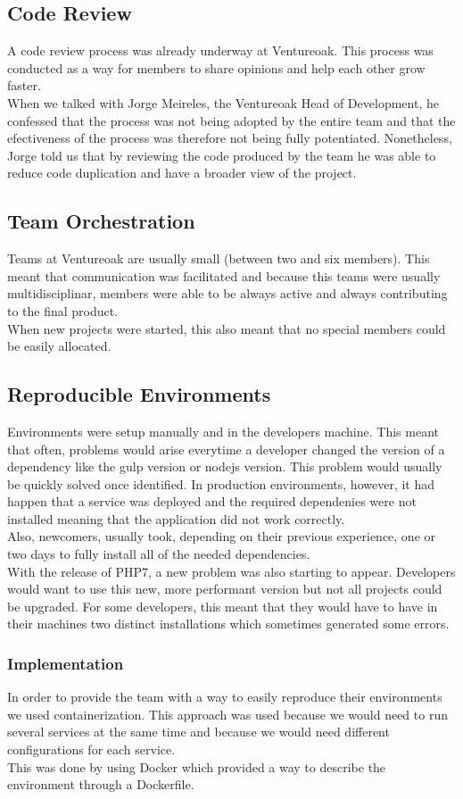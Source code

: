 			\subsection{Code Review}
			A code review process was already underway at Ventureoak. This process was conducted as a way for members to share opinions and help each other grow faster. \\
			When we talked with Jorge Meireles, the Ventureoak Head of Development, he confessed that the process was not being adopted by the entire team and that the efectiveness of the process was therefore not being fully potentiated. Nonetheless, Jorge told us that by reviewing the code produced by the team he was able to reduce code duplication and have a broader view of the project.
			\subsection{Team Orchestration}
			Teams at Ventureoak are usually small (between two and six members). This meant that communication was facilitated and because this teams were usually multidisciplinar, members were able to be always active and always contributing to the final product. \\
			When new projects were started, this also meant that no special members could be easily allocated.
			\subsection{Reproducible Environments}
					Environments were setup manually and in the developers machine. This meant that often, problems would arise everytime a developer changed the version of a dependency like the gulp version or nodejs version. This problem would usually be quickly solved once identified. In production environments, however, it had happen that a service was deployed and the required dependenies were not installed meaning that the application did not work correctly. \\
					Also, newcomers, usually took, depending on their previous experience, one or two days to fully install all of the needed dependencies. \\
					With the release of PHP7, a new problem was also starting to appear. Developers would want to use this new, more performant version but not all projects could be upgraded. For some developers, this meant that they would have to have in their machines two distinct installations which sometimes generated some errors.
				\subsubsection*{Implementation}
					In order to provide the team with a way to easily reproduce their environments we used containerization. This approach was used because we would need to run several services at the same time and because we would need different configurations for each service.\\
					This was done by using Docker which provided a way to describe the environment through a Dockerfile.
